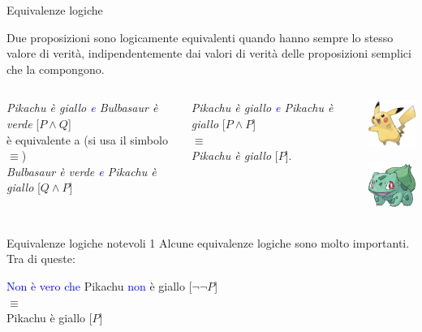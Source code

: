 \documentclass[aspectratio=169,10pt]{beamer}
\newcommand{\conn}[1]{\textcolor{blue}{#1}}
\begin{document}
\begin{frame}{Equivalenze logiche}
    \begin{definition}
    Due proposizioni sono \alert{logicamente equivalenti} quando hanno sempre lo stesso valore di verità, indipendentemente dai valori di verità delle proposizioni semplici che la compongono.
    \end{definition}
    \begin{columns}
     \begin{example}
        \emph{Pikachu è giallo \conn{e} Bulbasaur è verde} [\alert{$P \wedge Q$}]\medskip\\
        \hspace{1cm} è equivalente a  (si usa il simbolo $\equiv$)\medskip\\
        \emph{Bulbasaur è verde \conn{e} Pikachu è giallo} [\alert{$Q \wedge P$}]
     \end{example}
     \begin{example}
        \emph{Pikachu è giallo \conn{e} Pikachu è giallo}  [\alert{$P \wedge P$}]\medskip\\
        \hspace{1cm}$\equiv$\medskip\\
        \emph{Pikachu è giallo}  [\alert{$P$}].
     \end{example}
            \begin{center}
                \includegraphics[width=2cm,keepaspectratio]{Pikachu.png}

                \includegraphics[width=2cm,keepaspectratio]{Bulbasaur.png}
            \end{center}
    \end{columns}
\end{frame}

\begin{frame}{Equivalenze logiche notevoli 1}
Alcune equivalenze logiche sono molto importanti. Tra di queste:
\begin{example}
\conn{Non è vero che} Pikachu \conn{non} è giallo [\alert{$\neg \neg P$}]\\
\medskip
\hspace{1cm}$\equiv$\\
\medskip
Pikachu è giallo [\alert{$P$}]
\end{example}
\end{frame}
\end{document}
